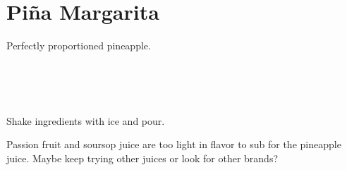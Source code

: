 \section[Pi\~{n}a Margarita]{Pi\~{n}a Margarita~\vegan}


\begin{recipestats}[
	servings=1,
	preptime=5 \minute,
	source=\citefield{cointreauPineapple}{shorttitle}\cite{cointreauPineapple},
]
\end{recipestats}


\begin{recipeabstract}
	Perfectly proportioned pineapple.
\end{recipeabstract}


\begin{ingredientcolumns}[1]
	\begin{ingredientblock}
		\\
		\\
		\\
	\end{ingredientblock}
\end{ingredientcolumns}


\begin{preparation}
\item Shake ingredients with ice and pour.
\end{preparation}


\begin{experiments}
\item Passion fruit and soursop juice are too light in flavor to sub for the pineapple juice.
	Maybe keep trying other juices or look for other brands?
\end{experiments}


\recipeend

